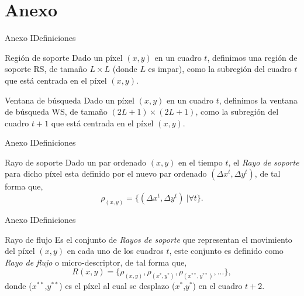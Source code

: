 \documentclass{beamer}
\begin{document}
\section*{Anexo}
	\begin{frame}{Anexo I}{Definiciones}
		\begin{block}{Región de soporte}
                  Dado un píxel $(x,y)$ en un cuadro $t$, definimos una región de soporte RS, de tamaño $L \times L$ (donde $L$ es impar), como la subregión del cuadro $t$ que está centrada en el píxel $(x,y)$.
         \end{block}
         \begin{block}{Ventana de búsqueda}
                  Dado un píxel $(x,y)$ en un cuadro $t$, definimos la ventana de búsqueda WS, de  tamaño $(2L+1) \times (2L+1)$, como la subregión del cuadro $t+1$ que está centrada en el píxel $(x,y)$.
         \end{block}
    	\end{frame}
	\begin{frame}{Anexo I}{Definiciones}
		\begin{block}{Rayo de soporte}
                Dado un par ordenado $(x,y)$ en el tiempo $t$, el \textit{Rayo de soporte} para dicho píxel esta definido por el nuevo par ordenado $(\Delta x^{t}, \Delta y^{t})$, de tal forma que,
			\begin{equation}
				\rho_{(x,y)} = \{(\Delta x^{t}, \Delta y^{t})~| \forall t\}.
			\end{equation}		 
        \end{block}   
    \end{frame}
	\begin{frame}{Anexo I}{Definiciones}
	    \begin{block}{Rayo de flujo}
                Es el conjunto de \textit{Rayos de soporte} que representan el movimiento del píxel $(x,y)$ en cada uno de los cuadros $t$, este conjunto es definido como \textit{Rayo de flujo} o micro-descriptor, de tal forma que,
			\begin{equation}
				R(x,y)	 = \{\rho_{(x,y)}, \rho_{(x^*,y^*)}, \rho_{(x^{**},y^{**})}, ... \},
			\end{equation}
		donde ($x^{**}$,$y^{**}$) es el píxel al cual se desplazo ($x^{*}$,$y^{*}$) en el cuadro $t+2$.  
        \end{block}      
    \end{frame}	
\end{document}
